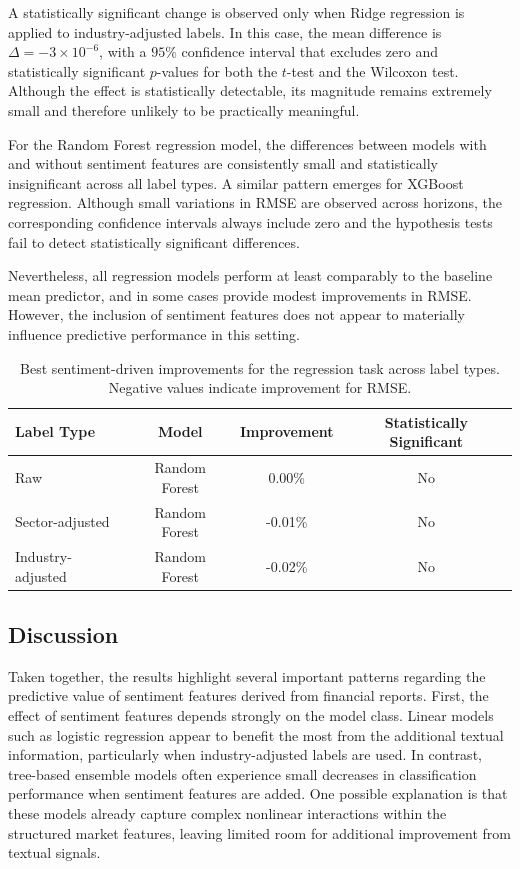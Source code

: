 A statistically significant change is observed only when Ridge regression is applied to industry-adjusted labels. In this case, the mean difference is $\Delta = -3 \times 10^{-6}$, with a $95\%$ confidence interval that excludes zero and statistically significant $p$-values for both the $t$-test and the Wilcoxon test. Although the effect is statistically detectable, its magnitude remains extremely small and therefore unlikely to be practically meaningful.

For the Random Forest regression model, the differences between models with and without sentiment features are consistently small and statistically insignificant across all label types. A similar pattern emerges for XGBoost regression. Although small variations in RMSE are observed across horizons, the corresponding confidence intervals always include zero and the hypothesis tests fail to detect statistically significant differences.

Nevertheless, all regression models perform at least comparably to the baseline mean predictor, and in some cases provide modest improvements in RMSE. However, the inclusion of sentiment features does not appear to materially influence predictive performance in this setting.

\begin{table}
\centering
\caption{Best sentiment-driven improvements for the regression task across label types. Negative values indicate improvement for RMSE.}
\label{tab:regression_best_models}
\begin{tabular}{lccc}
\hline
\textbf{Label Type} & \textbf{Model} & \textbf{Improvement} & \textbf{Statistically Significant} \\
\hline
Raw & Random Forest & 0.00\% & No \\
Sector-adjusted & Random Forest & -0.01\% & No \\
Industry-adjusted & Random Forest & -0.02\% & No \\
\hline
\end{tabular}
\end{table}

\subsection{Discussion}

Taken together, the results highlight several important patterns regarding the predictive value of sentiment features derived from financial reports.
First, the effect of sentiment features depends strongly on the model class. Linear models such as logistic regression appear to benefit the most from the additional textual information, particularly when industry-adjusted labels are used. In contrast, tree-based ensemble models often experience small decreases in classification performance when sentiment features are added. One possible explanation is that these models already capture complex nonlinear interactions within the structured market features, leaving limited room for additional improvement from textual signals.

